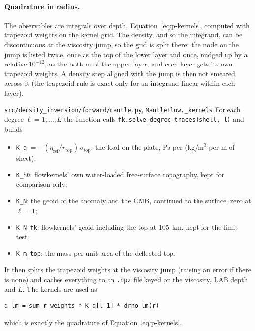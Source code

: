 \paragraph{Quadrature in radius.}
The observables are integrals over depth, Equation~\eqref{eq:p-kernels}, computed with trapezoid weights on the kernel grid.
The density, and so the integrand, can be discontinuous at the viscosity jump, so the grid is split there: the node on the jump is listed twice, once as the top of the lower layer and once, nudged up by a relative $10^{-12}$, as the bottom of the upper layer, and each layer gets its own trapezoid weights.
A density step aligned with the jump is then not smeared across it (the trapezoid rule is exact only for an integrand linear within each layer).

\begin{incode}{\texttt{src/density\_inversion/forward/mantle.py}, \texttt{MantleFlow.\_kernels}}
For each degree $\ell = 1,\dots,L$ the function calls \texttt{fk.solve\_degree\_traces(shell, l)} and builds
\begin{itemize}[nosep]
\item \texttt{K\_q} $= -(\eta_{\mathrm{ref}}/r_{\mathrm{top}})\,\sigma_{\mathrm{top}}$: the load on the plate, \si{Pa} per (\si{kg/m^3} per m of sheet);
\item \texttt{K\_h0}: flowkernels' own water-loaded free-surface topography, kept for comparison only;
\item \texttt{K\_N}: the geoid of the anomaly and the CMB, continued to the surface, zero at $\ell=1$;
\item \texttt{K\_N\_fk}: flowkernels' geoid including the top at \qty{105}{km}, kept for the limit test;
\item \texttt{K\_m\_top}: the mass per unit area of the deflected top.
\end{itemize}
It then splits the trapezoid weights at the viscosity jump (raising an error if there is none) and caches everything to an \texttt{.npz} file keyed on the viscosity, LAB depth and $L$.
The kernels are used as
\begin{lstlisting}
q_lm = sum_r weights * K_q[l-1] * drho_lm(r)
\end{lstlisting}
which is exactly the quadrature of Equation~\eqref{eq:p-kernels}.
\end{incode}

